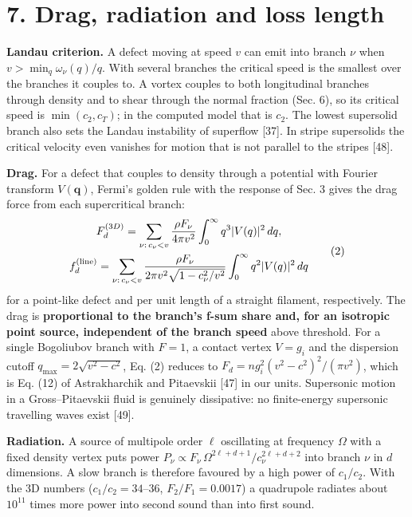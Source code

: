 \documentclass[
  11pt,
]{article}
\begin{document}
\hypertarget{drag-radiation-and-loss-length}{%
\section{7. Drag, radiation and loss
length}\label{drag-radiation-and-loss-length}}

\textbf{Landau criterion.} A defect moving at speed \(v\) can emit into
branch \(\nu\) when \(v>\min_q\omega_\nu(q)/q\). With several branches
the critical speed is the smallest over the branches it couples to. A
vortex couples to both longitudinal branches through density and to
shear through the normal fraction (Sec. 6), so its critical speed is
\(\min(c_2,c_T)\); in the computed model that is \(c_2\). The lowest
supersolid branch also sets the Landau instability of superflow
{[}37{]}. In stripe supersolids the critical velocity even vanishes for
motion that is not parallel to the stripes {[}48{]}.

\textbf{Drag.} For a defect that couples to density through a potential
with Fourier transform \(V(\mathbf q)\), Fermi's golden rule with the
response of Sec. 3 gives the drag force from each supercritical branch:
\[\begin{gathered}F_d^{(3D)}=\sum_{\nu:\,c_\nu<v}\frac{\rho F_\nu}{4\pi v^2}\int_0^\infty q^3|V(q)|^2\,dq ,\\
f_d^{(\rm line)}=\sum_{\nu:\,c_\nu<v}\frac{\rho F_\nu}{2\pi v^2\sqrt{1-c_\nu^2/v^2}}\int_0^\infty q^2|V(q)|^2\,dq \end{gathered}\tag{2}\]
for a point-like defect and per unit length of a straight filament,
respectively. The drag is \textbf{proportional to the branch's f-sum
share and, for an isotropic point source, independent of the branch
speed} above threshold. For a single Bogoliubov branch with \(F=1\), a
contact vertex \(V=g_i\) and the dispersion cutoff
\(q_{\max}=2\sqrt{v^2-c^2}\), Eq. (2) reduces to
\(F_d=n g_i^2(v^2-c^2)^2/(\pi v^2)\), which is Eq. (12) of Astrakharchik
and Pitaevskii {[}47{]} in our units. Supersonic motion in a
Gross--Pitaevskii fluid is genuinely dissipative: no finite-energy
supersonic travelling waves exist {[}49{]}.

\textbf{Radiation.} A source of multipole order \(\ell\) oscillating at
frequency \(\Omega\) with a fixed density vertex puts power
\(P_\nu\propto F_\nu\,\Omega^{2\ell+d+1}/c_\nu^{2\ell+d+2}\) into branch
\(\nu\) in \(d\) dimensions. A slow branch is therefore favoured by a
high power of \(c_1/c_2\). With the 3D numbers (\(c_1/c_2=34\)--\(36\),
\(F_2/F_1=0.0017\)) a quadrupole radiates about \(10^{11}\) times more
power into second sound than into first sound.
\end{document}
